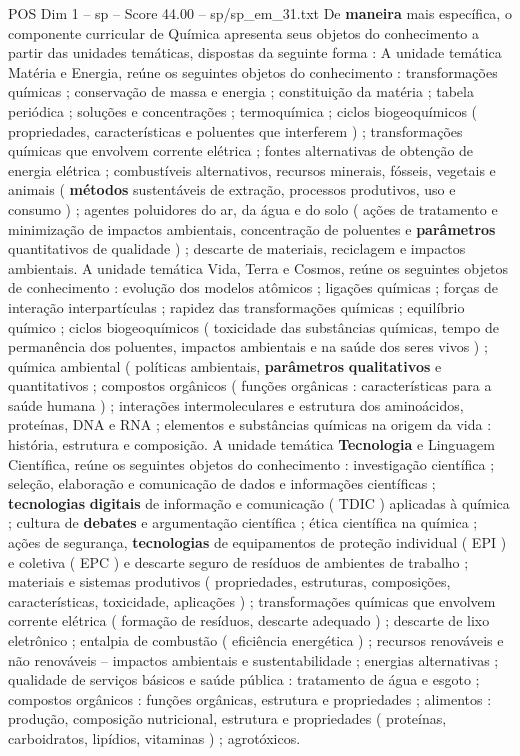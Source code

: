 \begin{textsample}{POS Dim 1 – sp – Score 44.00 – sp/sp\_em\_31.txt}
De \textbf{maneira} mais específica, o componente curricular de Química apresenta seus objetos do conhecimento a partir das unidades temáticas, dispostas da seguinte forma : A unidade temática Matéria e Energia, reúne os seguintes objetos do conhecimento : transformações químicas ; conservação de massa e energia ; constituição da matéria ; tabela periódica ; soluções e concentrações ; termoquímica ; ciclos biogeoquímicos ( propriedades, características e poluentes que interferem ) ; transformações químicas que envolvem corrente elétrica ; fontes alternativas de obtenção de energia elétrica ; combustíveis alternativos, recursos minerais, fósseis, vegetais e animais ( \textbf{métodos} sustentáveis de extração, processos produtivos, uso e consumo ) ; agentes poluidores do ar, da água e do solo ( ações de tratamento e minimização de impactos ambientais, concentração de poluentes e \textbf{parâmetros} quantitativos de qualidade ) ; descarte de materiais, reciclagem e impactos ambientais.
A unidade temática Vida, Terra e Cosmos, reúne os seguintes objetos de conhecimento : evolução dos modelos atômicos ; ligações químicas ; forças de interação interpartículas ; rapidez das transformações químicas ; equilíbrio químico ; ciclos biogeoquímicos ( toxicidade das substâncias químicas, tempo de permanência dos poluentes, impactos ambientais e na saúde dos seres vivos ) ; química ambiental ( políticas ambientais, \textbf{parâmetros} \textbf{qualitativos} e quantitativos ; compostos orgânicos ( funções orgânicas : características para a saúde humana ) ; interações intermoleculares e estrutura dos aminoácidos, proteínas, DNA e RNA ; elementos e substâncias químicas na origem da vida : história, estrutura e composição.
A unidade temática \textbf{Tecnologia} e Linguagem Científica, reúne os seguintes objetos do conhecimento : investigação científica ; seleção, elaboração e comunicação de dados e informações científicas ; \textbf{tecnologias} \textbf{digitais} de informação e comunicação ( TDIC ) aplicadas à química ; cultura de \textbf{debates} e argumentação científica ; ética científica na química ; ações de segurança, \textbf{tecnologias} de equipamentos de proteção individual ( EPI ) e coletiva ( EPC ) e descarte seguro de resíduos de ambientes de trabalho ; materiais e sistemas produtivos ( propriedades, estruturas, composições, características, toxicidade, aplicações ) ; transformações químicas que envolvem corrente elétrica ( formação de resíduos, descarte adequado ) ; descarte de lixo eletrônico ; entalpia de combustão ( eficiência energética ) ; recursos renováveis e não renováveis – impactos ambientais e sustentabilidade ; energias alternativas ; qualidade de serviços básicos e saúde pública : tratamento de água e esgoto ; compostos orgânicos : funções orgânicas, estrutura e propriedades ; alimentos : produção, composição nutricional, estrutura e propriedades ( proteínas, carboidratos, lipídios, vitaminas ) ; agrotóxicos.

\end{textsample}
